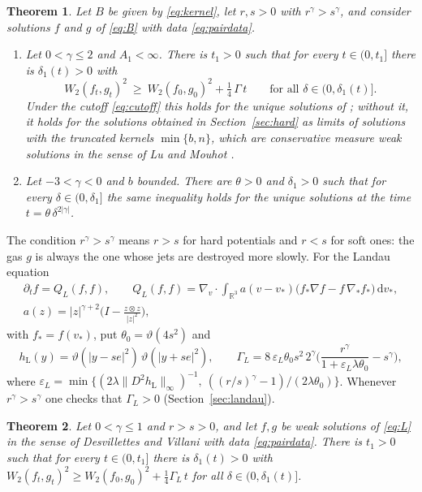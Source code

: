 \documentclass[11pt]{amsart}
\newtheorem{mainthm}{Theorem}
\theoremstyle{definition}
\newcommand{\RR}{\mathbb{R}}
\newcommand{\dd}{\,\mathrm{d}}
\newcommand{\hL}{h_{\mathrm L}}
\begin{document}
\begin{mainthm}\label{thm:A}
Let $B$ be given by \eqref{eq:kernel}, let $r,s>0$ with $r^\gamma>s^\gamma$, and consider solutions $f$ and $g$ of \eqref{eq:B} with data \eqref{eq:pairdata}.
\begin{enumerate}
\item[(i)] Let $0<\gamma\le2$ and $A_1<\infty$. There is $t_1>0$ such that for every $t\in(0,t_1]$ there is $\delta_1(t)>0$ with
\[
W_2(f_t,g_t)^2\ \ge\ W_2(f_0,g_0)^2+\tfrac14\,\Gamma\,t\qquad\text{for all }\delta\in(0,\delta_1(t)].
\]
Under the cutoff \eqref{eq:cutoff} this holds for the unique solutions of \cite{MW99}; without it, it holds for the solutions obtained in Section~\ref{sec:hard} as limits of solutions with the truncated kernels $\min\{b,n\}$, which are conservative measure weak solutions in the sense of Lu and Mouhot \cite{LM12}.
\item[(ii)] Let $-3<\gamma<0$ and $b$ bounded. There are $\theta>0$ and $\delta_1>0$ such that for every $\delta\in(0,\delta_1]$ the same inequality holds for the unique solutions at the time $t=\theta\,\delta^{2|\gamma|}$.
\end{enumerate}
\end{mainthm}

The condition $r^\gamma>s^\gamma$ means $r>s$ for hard potentials and $r<s$ for soft ones: the gas $g$ is always the one whose jets are destroyed more slowly. For the Landau equation
\begin{equation}\label{eq:L}
\begin{gathered}\partial_tf=Q_L(f,f),\qquad Q_L(f,f)=\nabla_v\cdot\int_{\RR^3}a(v-v_*)\big(f_*\nabla f-f\,\nabla_*f_*\big)\dd v_*,\\ a(z)=|z|^{\gamma+2}\Big(I-\frac{z\otimes z}{|z|^2}\Big),\end{gathered}
\end{equation}
with $f_*=f(v_*)$, put $\theta_0=\vartheta(4s^2)$ and
\begin{equation}\label{eq:hL}
\hL(y)=\vartheta(|y-se|^2)\,\vartheta(|y+se|^2),\qquad
\Gamma_L=8\,\varepsilon_L\theta_0 s^2\,2^\gamma\Big(\frac{r^\gamma}{1+\varepsilon_L\lambda\theta_0}-s^\gamma\Big),
\end{equation}
where $\varepsilon_L=\min\{(2\lambda\|D^2\hL\|_\infty)^{-1},\ ((r/s)^\gamma-1)/(2\lambda\theta_0)\}$. Whenever $r^\gamma>s^\gamma$ one checks that $\Gamma_L>0$ (Section~\ref{sec:landau}).

\begin{mainthm}\label{thm:B}
Let $0<\gamma\le1$ and $r>s>0$, and let $f,g$ be weak solutions of \eqref{eq:L} in the sense of Desvillettes and Villani \cite{DV00} with data \eqref{eq:pairdata}. There is $t_1>0$ such that for every $t\in(0,t_1]$ there is $\delta_1(t)>0$ with $W_2(f_t,g_t)^2\ge W_2(f_0,g_0)^2+\frac14\Gamma_L\,t$ for all $\delta\in(0,\delta_1(t)]$.
\end{mainthm}
\end{document}
